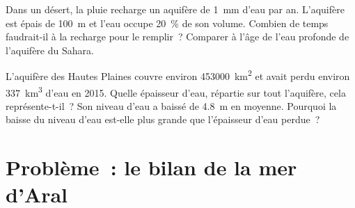 \begin{exercise}[$\star\star\star$]\label{exo:g10:freshwater-resources:14}
Dans un désert, la pluie recharge un aquifère de \qty{1}{mm} d'eau par an.
L'aquifère est épais de \qty{100}{m} et l'eau occupe \qty{20}{\percent} de
son volume. Combien de temps faudrait-il à la recharge pour le remplir~?
Comparer à l'âge de l'eau profonde de l'aquifère du Sahara.
\end{exercise}

\begin{exercise}[$\star\star\star$]\label{exo:g10:freshwater-resources:15}
L'aquifère des Hautes Plaines couvre environ \qty{453000}{km^2} et avait
perdu environ \qty{337}{km^3} d'eau en 2015. Quelle épaisseur d'eau,
répartie sur tout l'aquifère, cela représente-t-il~? Son niveau d'eau a
baissé de \qty{4.8}{m} en moyenne. Pourquoi la baisse du niveau d'eau
est-elle plus grande que l'épaisseur d'eau perdue~?
\end{exercise}

\section{Problème~: le bilan de la mer d'Aral}

